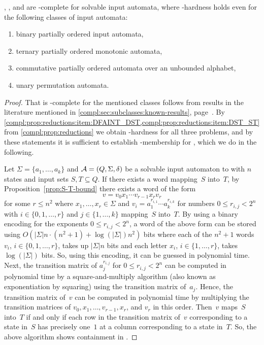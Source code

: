\begin{theorem}\label{thm:solvable} \label{compl:thm:comm_ST}
	\ST, \DST, and \DFAINT are \NP-complete for solvable input automata,
	where \NP-hardness holds
	even for the following classes of input automata:
	\begin{enumerate}
		\item binary partially ordered input automata,
		
		\item ternary partially ordered monotonic automata,
		
		\item commutative partially ordered  automata over an unbounded alphabet,
		
		\item unary permutation automata.
	\end{enumerate}
\end{theorem}
\begin{proof}
	That \DFAINT is \NP-complete for the mentioned
    classes follows from results
    in the literature mentioned in \cref{compl:sec:subclasses:known-results}, page~\pageref{prelim:classes:intro:INT}.
    By \cref{compl:prop:reductions:item:DFAINT_DST,compl:prop:reductions:item:DST_ST}
    from \cref{compl:prop:reductions} 
    we obtain \NP-hardness for all three problems,
    and by these statements it is sufficient to establish \NP-membership
    for \ST, which we do in the following.
    
	Let $\Sigma = \{a_1, \ldots, a_k\}$ and 
	$\mathcal A = (Q, \Sigma, \delta)$ be a solvable
	input automaton to \ST with $n$ states and input sets $S, T \subseteq Q$.
	If there exists a word mapping~$S$ into~$T$,
	by Proposition~\ref{prop:S-T-bound} there exists a word
	of the form
	\[ 
	v = v_0 x_1 \cdots v_{r-1} x_r v_r
	\]
	for some $r \le n^2$
	where $x_1, \ldots, x_r \in \Sigma$ and $v_i = a_1^{r_{i,1}} \cdots a_k^{r_{i,k}}$
	for numbers $0 \le r_{i,j} < 2^n$
	with $i \in \{0,1,\ldots,r\}$ and $j \in \{1,\ldots,k\}$
	mapping~$S$ into~$T$.
	By using a binary encoding for the exponents $0 \le r_{i,j} < 2^n$,
	a word of the above form can be stored using 
	$O( |\Sigma|n \cdot (n^2 + 1) + \log(|\Sigma|)n^2)$
	bits where each of the $n^2+1$ words $v_i$, $i \in \{0,1,\ldots,r\}$,
	takes up $|\Sigma|n$ bits and each letter $x_i$, $i \in \{1,\ldots,r\}$,
	takes $\log( |\Sigma| )$ bits.
	So, using this encoding, it can be guessed in polynomial time.
	Next, the transition matrix
	of $a_j^{r_{i,j}}$ for $0 \le r_{i,j} < 2^n$
	can be computed in polynomial time by a square-and-multiply algorithm (also known as 
	exponentiation by squaring) 
	using the transition matrix of~$a_j$.
	Hence, the transition matrix of~$v$
	can be computed in polynomial time by multiplying
	the transition matrices of $v_0, x_1, \ldots, v_{r-1}, x_r$, and $v_r$ in this order.
	Then~$v$ maps~$S$ into~$T$
	if and only if each row in the transition matrix of~$v$ corresponding to a state in~$S$
	has precisely one~$1$ at a column corresponding to a state in~$T$.
	So, the above algorithm shows containment in \NP. 
\end{proof}


